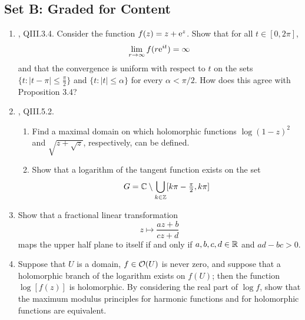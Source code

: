 \documentclass[../psets.tex]{subfiles}
\begin{document}
\subsection*{Set B: Graded for Content}
\begin{enumerate}[label={\textbf{\arabic*.}}]
    \item \textcite{bib:FischerLieb}, QIII.3.4. Consider the function $f(z)=z+\e[z]$. Show that for all $t\in[0,2\pi]$,
    \begin{equation*}
        \lim_{r\to\infty}f(r\e[it]) = \infty
    \end{equation*}
    and that the convergence is uniform with respect to $t$ on the sets $\{t:|t-\pi|\leq\tfrac{\pi}{2}\}$ and $\{t:|t|\leq\alpha\}$ for every $\alpha<\pi/2$. How does this agree with Proposition 3.4?
    \item \textcite{bib:FischerLieb}, QIII.5.2.
    \begin{enumerate}
        \item Find a maximal domain on which holomorphic functions $\log(1-z)^2$ and $\sqrt{z+\sqrt{z}}$, respectively, can be defined.
        \item Show that a logarithm of the tangent function exists on the set
        \begin{equation*}
            G = \C\setminus\bigcup_{k\in\Z}[k\pi-\tfrac{\pi}{2},k\pi]
        \end{equation*}
    \end{enumerate}
    \item Show that a fractional linear transformation
    \begin{equation*}
        z \mapsto \frac{az+b}{cz+d}
    \end{equation*}
    maps the upper half plane to itself if and only if $a,b,c,d\in\R$ and $ad-bc>0$.
    \item Suppose that $U$ is a domain, $f\in\mO(U)$ is never zero, and suppose that a holomorphic branch of the logarithm exists on $f(U)$; then the function $\log[f(z)]$ is holomorphic. By considering the real part of $\log f$, show that the maximum modulus principles for harmonic functions and for holomorphic functions are equivalent.
\end{enumerate}
\end{document}
